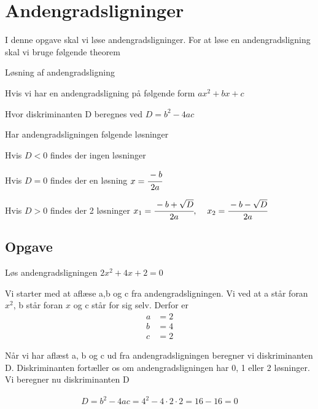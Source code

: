 \section{Andengradsligninger}

I denne opgave skal vi løse andengradsligninger. For at løse en andengradsligning skal vi bruge følgende theorem

\begin{frm-thm}{Løsning af andengradsligning}

Hvis vi har en andengradsligning på følgende form \hspace*{2cm} $ax^2 + bx + c$

Hvor diskriminanten D beregnes ved \hspace*{4.2cm} $D = b^2 -4ac$

Har andengradsligningen følgende løsninger

\vspace*{4mm}

Hvis $D < 0$ findes der ingen løsninger

Hvis $D = 0$ findes der en løsning \hspace*{4.7cm} $x = \cfrac{-b}{2a}$

Hvis $D > 0$ findes der 2 løsninger \hspace*{4.6cm} $x_1 = \cfrac{-b + \sqrt{D}}{2a}, \hspace*{4mm} x_2 = \cfrac{-b - \sqrt{D}}{2a}$

\end{frm-thm}

\subsection{Opgave}
Løs andengradsligningen $2x^2 + 4x + 2 = 0$

Vi starter med at aflæse a,b og c fra andengradsligningen. Vi ved at a står foran $x^2$, b står foran $x$ og c står for sig selv. Derfor er 
\begin{align*}
a &= 2\\
b &= 4\\
c &= 2
\end{align*}

Når vi har aflæst a, b og c ud fra andengradsligningen beregner vi diskriminanten D. Diskriminanten fortæller os om andengradsligningen har 0, 1 eller 2 løsninger. Vi beregner nu diskriminanten D

\begin{align*}
D = b^2 - 4ac = 4^2 - 4 \cdot 2 \cdot 2 = 16 - 16 = 0
\end{align*}

